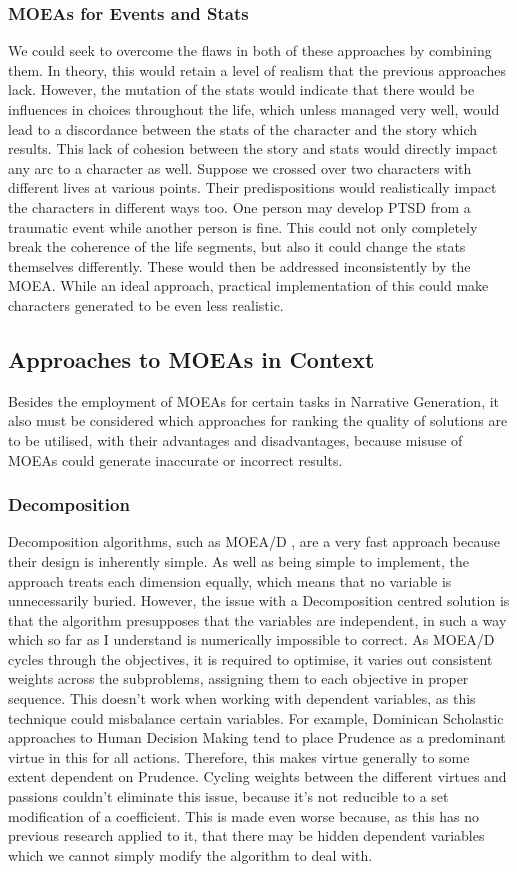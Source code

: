 \documentclass[11pt]{article}
\begin{document}
\subsubsection{MOEAs for Events and Stats} 
We could seek to overcome the flaws in both of these approaches by combining them. In theory, this would retain a level of realism that the previous approaches lack. However, the mutation of the stats would indicate that there would be influences in choices throughout the life, which unless managed very well, would lead to a discordance between the stats of the character and the story which results. This lack of cohesion between the story and stats would directly impact any arc to a character as well. Suppose we crossed over two characters with different lives at various points. Their predispositions would realistically impact the characters in different ways too. One person may develop PTSD from a traumatic event while another person is fine. This could not only completely break the coherence of the life segments, but also it could change the stats themselves differently. These would then be addressed inconsistently by the MOEA. While an ideal approach, practical implementation of this could make characters generated to be even less realistic. \\

\subsection{Approaches to MOEAs in Context}
Besides the employment of MOEAs for certain tasks in Narrative Generation, it also must be considered which approaches for ranking the quality of solutions are to be utilised, with their advantages and disadvantages, because misuse of MOEAs could generate inaccurate or incorrect results.
\subsubsection{Decomposition}
Decomposition algorithms, such as MOEA/D \cite{MOEAD}, are a very fast approach because their design is inherently simple. As well as being simple to implement, the approach treats each dimension equally, which means that no variable is unnecessarily buried. However, the issue with a Decomposition centred solution is that the algorithm presupposes that the variables are independent, in such a way which so far as I understand is numerically impossible to correct. As MOEA/D cycles through the objectives, it is required to optimise, it varies out consistent weights across the subproblems, assigning them to each objective in proper sequence. This doesn't work when working with dependent variables, as this technique could misbalance certain variables. For example, Dominican Scholastic approaches to Human Decision Making tend to place Prudence as a predominant virtue in this for all actions. Therefore, this makes virtue generally to some extent dependent on Prudence. Cycling weights between the different virtues and passions couldn't eliminate this issue, because it's not reducible to a set modification of a coefficient. This is made even worse because, as this has no previous research applied to it, that there may be hidden dependent variables which we cannot simply modify the algorithm to deal with.  \\
\end{document}
